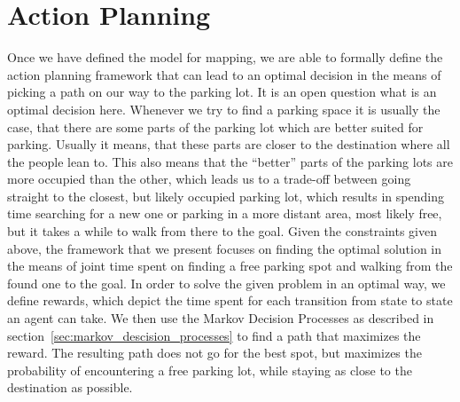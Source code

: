\section{Action Planning} %
\label{sec:action_planning}
    Once we have defined the model for mapping, we are able to formally define the action planning framework that can lead to an optimal decision in the means of picking a path on our way to the parking lot.
    It is an open question what is an optimal decision here. Whenever we try to find a parking space it is usually the case, that there are some parts of the parking lot which are better suited for parking. Usually it means, that these parts are closer to the destination where all the people lean to.
    This also means that the ``better'' parts of the parking lots are more occupied than the other, which leads us to a trade-off between going straight to the closest, but likely occupied parking lot, which results in spending time searching for a new one or parking in a more distant area, most likely free, but it takes a while to walk from there to the goal.
    Given the constraints given above, the framework that we present focuses on finding the optimal solution in the means of joint time spent on finding a free parking spot and walking from the found one to the goal.
    In order to solve the given problem in an optimal way, we define rewards, which depict the time spent for each transition from state to state an agent can take. We then use the Markov Decision Processes as described in section~\ref{sec:markov_descision_processes} to find a path that maximizes the reward.
    The resulting path does not go for the best spot, but maximizes the probability of encountering a free parking lot, while staying as close to the destination as possible.

